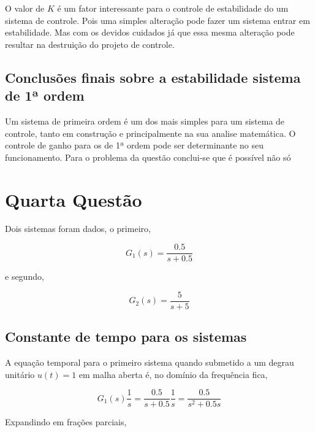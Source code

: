 \documentclass[paper=a4, fontsize=11pt]{article}
\begin{document}
O valor de $K$ é um fator interessante para o controle de estabilidade do um 
sistema de controle. Pois uma simples alteração pode fazer um sistema 
entrar em estabilidade. Mas com os devidos cuidados já que essa mesma alteração
pode resultar na destruição do projeto de controle.

\subsection{Conclusões finais sobre a estabilidade sistema de 1ª ordem}

Um sistema de primeira ordem é um dos mais simples para um sistema de controle, 
tanto em construção e principalmente na sua analise matemática. O controle
de ganho para os de 1ª ordem pode ser determinante no seu funcionamento. 
Para o problema da questão conclui-se que é possível não só


\newpage

\section{Quarta Questão}

Dois sistemas foram dados, o primeiro,

\begin{equation}
    G_1(s) = \frac{0.5}{s+0.5}
\end{equation}

e segundo,

\begin{equation}
    G_2(s) = \frac{5}{s+5}
\end{equation}

\subsection{Constante de tempo para os sistemas}

A equação temporal para o primeiro sistema quando submetido a um 
degrau unitário $u(t)=1$ em malha aberta é, no domínio da frequência fica,

\begin{equation}
    G_1(s) \frac{1}{s} = \frac{0.5}{s+0.5} \frac{1}{s} = \frac{0.5}{s^2 + 0.5 s}
\end{equation}
 
Expandindo em frações parciais,
\end{document}
